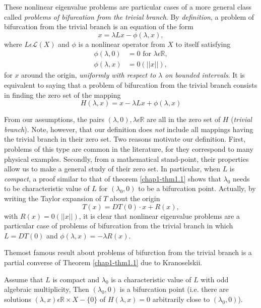 These nonlinear eigenvalue problems are particular cases of a more general class called {\em problems of bifurcation from the trivial branch}. By {\em definition}, a problem of bifurcation from the trivial branch is an equation of the form
$$
x = \lambda L x - \phi (\lambda, x),
$$
where $L \epsilon \mathscr{L}(X)$ and $\phi$ is a nonlinear operator from $X$ to itself satisfying\pageoriginale
\begin{align*}
\phi (\lambda, 0) & = 0 \text{ for } \lambda \epsilon \mathbb{R},\tag{1.1}\label{chap1-eq1.1}\\
\phi (\lambda, x) & = 0(||x||),\tag{1.2}\label{chap1-eq1.2}
\end{align*}
for $x$ around the origin, {\em uniformly with respect to $\lambda$ on bounded intervals}. It is equivalent to saying that a problem of bifurcation from the trivial branch consists in finding the zero set of the mapping
$$
H(\lambda, x) = x - \lambda L x + \phi (\lambda, x)
$$

From our assumptions, the pairs $(\lambda, 0), \lambda \epsilon \mathbb{R}$ are all in the zero set of $H$ ({\em trivial branch}). Note, however, that our definition does {\em not} include all mappings having the trivial branch in their zero set. Two reasons motivate our definition. First, problems of this type are common in the literature, for they correspond to many physical examples. Secondly, from a mathematical stand-point, their properties allow us to make a general study of their zero set. In particular, when $L$ is {\em compact}, a proof similar to that of theorem \ref{chap1-thm1.1} shows that $\lambda_{0}$ needs to be characteristic value of $L$ for $(\lambda_{0}, 0)$ to be a bifurcation point. Actually, by writing the Taylor expansion of $T$ about the origin
$$
T(x) = DT(0) \cdot x + R(x),
$$
with $R(x) = 0(||x||)$, it is clear that nonlinear eigenvalue problems are a particular case of problems of bifurcation from the trivial branch in which $L = DT(0)$ and $\phi(\lambda, x) = -\lambda R(x)$.

The\pageoriginale most famous result about problems of bifurction from the trivial branch is a partial converse of Theorem \ref{chap1-thm1.1} due to Kranoselskii.

\begin{theorem}[Krasnoselskii]\label{chap1-thm1.2}
Assume that $L$ is compact and $\lambda_{0}$ is a characteristic value of $L$ with odd algebraic multiplicity, Then $(\lambda_{0}, 0)$ is a bifurcation point (i.e. there are solutions $(\lambda, x) \epsilon \mathbb{R} \times X - \{0\}$ of $H(\lambda, x) = 0$ arbitrarily close to $(\lambda_{0}, 0)$).
\end{theorem}

